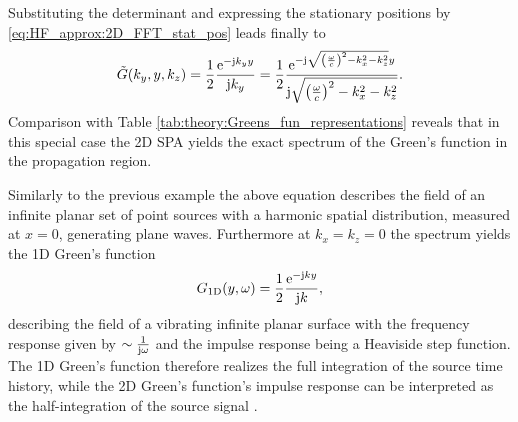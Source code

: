 Substituting the determinant and expressing the stationary positions by \eqref{eq:HF_approx:2D_FFT_stat_pos} leads finally to
\begin{equation}
\tilde{G}(k_y,y,k_z) =\frac{1}{2} \frac{\mathrm{e}^{-\mathrm{j} k_y y } }{\mathrm{j} k_y} =
\frac{1}{2} \frac{\mathrm{e}^{-\mathrm{j} \sqrt{\left(\frac{\omega}{c}\right)^2-k_x^2-k_z^2} y } }{ \mathrm{j} \sqrt{\left(\frac{\omega}{c}\right)^2-k_x^2-k_z^2} }.
\label{eq:HF_approx:Greens_2D_Spectrum}
\end{equation}
Comparison with Table \eqref{tab:theory:Greens_fun_representations} reveals that in this special case the 2D SPA yields the exact spectrum of the Green's function in the propagation region.

Similarly to the previous example the above equation describes the field of an infinite planar set of point sources with a harmonic spatial distribution, measured at $x = 0$, generating plane waves.
Furthermore at $k_x = k_z = 0$ the spectrum yields the 1D Green's function
\begin{equation}
G_{1\text{D}}(y,\omega) = \frac{1}{2} \frac{\mathrm{e}^{-\mathrm{j} k y } }{\mathrm{j} k},
\end{equation}
describing the field of a vibrating infinite planar surface with the frequency response given by $\sim \frac{1}{\mathrm{j} \omega}$ and the impulse response being a Heaviside step function.
The 1D Green's function therefore realizes the full integration of the source time history, while the 2D Green's function's impulse response can be interpreted as the half-integration of the source signal \cite{Deregowski1983, Wang2009, Wang2016, Schultz2013:IIR_prefilters}.